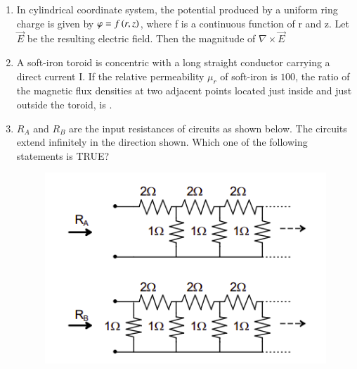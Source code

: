 \documentclass[journal,12pt,onecolumn]{IEEEtran}
\theoremstyle{remark}
\begin{document}
\begin{enumerate}[start=1, label=Q.\arabic*]
    \hfill{}

    \item In cylindrical coordinate system, the potential produced by a uniform ring charge is given by $\varphi=f\left(r,z\right)$, where f is a continuous function of r and z. Let $\vec{E}$ be the resulting electric field. Then the magnitude of $\nabla \times \vec{E}$
    \begin{enumerate}
    \end{enumerate}

    \hfill{}

    \item A soft-iron toroid is concentric with a long straight conductor carrying a direct current I. If the relative permeability $\mu_{r}$ of soft-iron is $100$, the ratio of the magnetic flux densities at two adjacent points located just inside and just outside the toroid, is \underline{\hspace{2cm}}.

    \hfill{}

    \item $R_{A}$ and $R_{B}$ are the input resistances of circuits as shown below. The circuits extend infinitely in the direction shown. Which one of the following statements is TRUE?
    \begin{figure}[H]
        \includegraphics[width=0.8\columnwidth]{Figures/q15.png}
        \centering
        \caption{}
    \end{figure}
    \begin{enumerate}
    \end{enumerate}


\end{enumerate}
\end{document}
